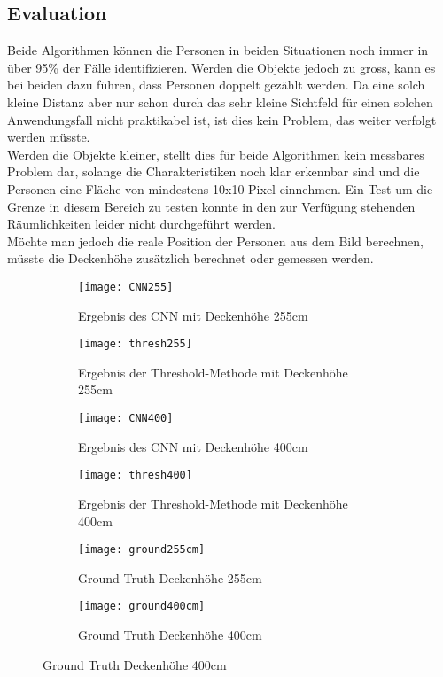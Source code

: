 \subsection{Evaluation}
Beide Algorithmen können die Personen in beiden Situationen noch immer in über 95\% der Fälle identifizieren. Werden die Objekte jedoch zu gross, kann es bei beiden dazu führen, dass Personen doppelt gezählt werden. Da eine solch kleine Distanz aber nur schon durch das sehr kleine Sichtfeld für einen solchen Anwendungsfall nicht praktikabel ist, ist dies kein Problem, das weiter verfolgt werden müsste.\\
Werden die Objekte kleiner, stellt dies für beide Algorithmen kein messbares Problem dar, solange die Charakteristiken noch klar erkennbar sind und die Personen eine Fläche von mindestens 10x10 Pixel einnehmen. Ein Test um die Grenze in diesem Bereich zu testen konnte in den zur Verfügung stehenden Räumlichkeiten leider nicht durchgeführt werden.\\
Möchte man jedoch die reale Position der Personen aus dem Bild berechnen, müsste die Deckenhöhe zusätzlich berechnet oder gemessen werden.

\begin{figure}[H]
	\begin{subfigure}{.4\linewidth}
		\centering
		\texttt{[image: CNN255]}
		\caption{Ergebnis des CNN mit Deckenhöhe 255cm}
		\label{fig:cnn255}
	\end{subfigure}\hfill%
	\begin{subfigure}{.4\linewidth}
		\centering
		\texttt{[image: thresh255]}
		\caption{Ergebnis der Threshold-Methode mit Deckenhöhe 255cm}
		\label{fig:thresh255}
	\end{subfigure}\hfill%
	\begin{subfigure}{.4\linewidth}
		\centering
		\texttt{[image: CNN400]}
		\caption{Ergebnis des CNN mit Deckenhöhe 400cm}
		\label{fig:cnn400}
	\end{subfigure}\hfill%
	\begin{subfigure}{.4\linewidth}
		\centering
		\texttt{[image: thresh400]}
		\caption{Ergebnis der Threshold-Methode mit Deckenhöhe 400cm}
		\label{fig:thresh400}
	\end{subfigure}\hfill%
	\begin{subfigure}{.45\linewidth}
		\centering
		\texttt{[image: ground255cm]}
		\caption{Ground Truth Deckenhöhe 255cm}
		\label{fig:ground255}
	\end{subfigure}\hfill%
	\begin{subfigure}{.45\linewidth}
		\centering
		\texttt{[image: ground400cm]}
		\caption{Ground Truth Deckenhöhe 400cm}
		\label{fig:ground400}
	\end{subfigure}
\end{figure}


